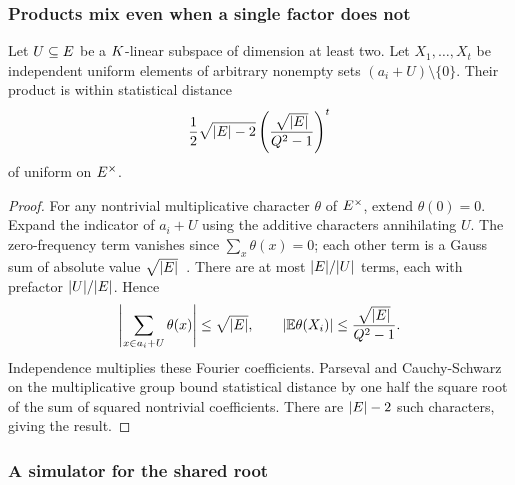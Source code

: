 \subsubsection{Products mix even when a single factor does not}

\begin{lemma}\label{lem:bus-mix}
Let $U\subseteq E$ be a $K$-linear subspace of dimension at least two. Let $X_1,\ldots,X_t$ be independent uniform elements of arbitrary nonempty sets $(a_i+U)\setminus\{0\}$. Their product is within statistical distance
\[
 \frac12\sqrt{|E|-2}
 \left(\frac{\sqrt{|E|}}{Q^2-1}\right)^t
\]
of uniform on $E^\times$.
\end{lemma}
\begin{proof}
For any nontrivial multiplicative character $\theta$ of $E^\times$, extend $\theta(0)=0$. Expand the indicator of $a_i+U$ using the additive characters annihilating $U$. The zero-frequency term vanishes since $\sum_x\theta(x)=0$; each other term is a Gauss sum of absolute value $\sqrt{|E|}$~\cite{conrad}. There are at most $|E|/|U|$ terms, each with prefactor $|U|/|E|$. Hence
\[
 \left|\sum_{x\in a_i+U}\theta(x)\right|\le\sqrt{|E|},
 \qquad |\mathbb E\theta(X_i)|\le\frac{\sqrt{|E|}}{Q^2-1}.
\]
Independence multiplies these Fourier coefficients. Parseval and Cauchy-Schwarz on the multiplicative group bound statistical distance by one half the square root of the sum of squared nontrivial coefficients. There are $|E|-2$ such characters, giving the result.
\end{proof}

\subsubsection{A simulator for the shared root}

